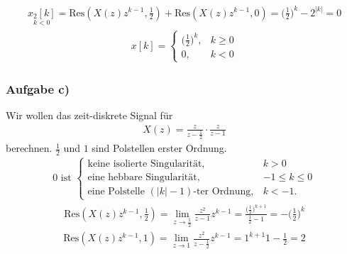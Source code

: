\begin{align}
	\underset{k<0}{x_2[k]}=\mathrm{Res}(X(z)z^{k-1},\frac{1}{2})+\mathrm{Res}(X(z)z^{k-1},0)=\bigg ( \frac{1}{2} \bigg)^k-2^{|k|}=0
\end{align}
\begin{align}
	x[k]=
	\begin{cases}
		\bigg (\frac{1}{2} \bigg)^k, &k\geq0 \\
		0, &k<0
	\end{cases}
\end{align}
\subsubsection{Aufgabe c)}
Wir wollen das zeit-diskrete Signal für 
\begin{align}
	X(z)=\frac{z}{z-\frac{1}{2}}\cdot\frac{z}{z-1}
\end{align}
berechnen.
$\frac{1}{2}$ und $1$ sind Polstellen erster Ordnung.
\begin{align}
	0\text{ ist }
	\begin{cases}
		\text{keine isolierte Singularität}, &k>0 \\
		\text{eine hebbare Singularität}, &-1\leq k \leq0 \\
		\text{eine Polstelle }(|k|-1)\text{-ter Ordnung}, &k < -1.
	\end{cases}
\end{align}
\begin{align}
	\mathrm{Res}(X(z)z^{k-1},\frac{1}{2})=\lim\limits_{z\rightarrow\frac{1}{2}}\frac{z^2}{z-1}z^{k-1}=\frac{\bigg (\frac{1}{2}\bigg)^{k+1}}{\frac{1}{2}-1}=-\bigg (\frac{1}{2}\bigg)^k
\end{align}
\begin{align}
	\mathrm{Res}(X(z)z^{k-1},1)=\lim\limits_{z\rightarrow1}\frac{z^2}{z-\frac{1}{2}}z^{k-1}=1^{k+1}{1-\frac{1}{2}}=2
\end{align}
